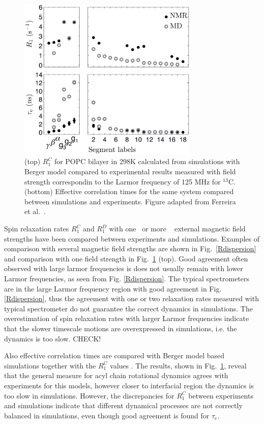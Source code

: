 \documentclass[aps,prl,superscriptaddress,twocolumn]{revtex4}
\begin{document}
\begin{figure}[]
  \includegraphics[width=8.6cm]{../Fig/RandEFFCT.eps}
\newline
  \caption{\label{RandEFFCT}
    (top)  $R_1^{C}$ for POPC bilayer in 298K calculated from simulations with Berger model compared to experimental results measured 
    with field strength correspondin to the Larmor frequency of 125 MHz for $^{13}$C.
    (bottom) Effective correlation times for the same system compared between simulations and experiments. 
    Figure adapted from Ferreira et al.~\cite{ferreira15}.
  } 
\end{figure}
Spin relaxation rates $R_1^{C}$ and $R_1^{D}$ with one~\cite{feller02,eldho03,ollila07a,klauda08b,klauda12,ferreira15} 
or more ~\cite{pastor88,lindahl01,pastor02,klauda08a,klauda08b,wohlert06} external magnetic field 
strengths have been compared between experiments and simulations. Examples of comparison with several
magnetic field strengths are shown in Fig.~\ref{Rdispersion} and comparison with one field strength 
in Fig.~\ref{RandEFFCT} (top). Good agreement often observed with large larmor frequencies 
is does not usually remain with lower Larmor frequencies, as seen from Fig. \ref{Rdispersion}. 
The typical spectrometers are in the large Larmor frequency region with good agreement in 
Fig. \ref{Rdispersion}, thus the agreement with one or two relaxation rates measured 
with typical spectrometer do not guarantee the correct dynamics in simulations.
The overestimation of spin relaxation rates with larger Larmor frequencies indicate 
that the slower timescale motions are overexpressed in simulations, i.e. the dynamics is
too slow. CHECK!

Also effective correlation times are compared with Berger model based simulations together
with the $R_1^{C}$ values \cite{ferreire15}. The results, shown in Fig.~\ref{RandEFFCT},
reveal that the general measure for acyl chain rotational dynamics agrees with experiments for this
models, however closer to interfacial region the dynamics is too slow in simulations. 
However, the discrepancies for $R_1^{C}$ between experiments and simulations indicate that 
different dynamical processes are not correctly balanced in simulations, even though good
agreement is found for $\tau_e$.  
\end{document}
